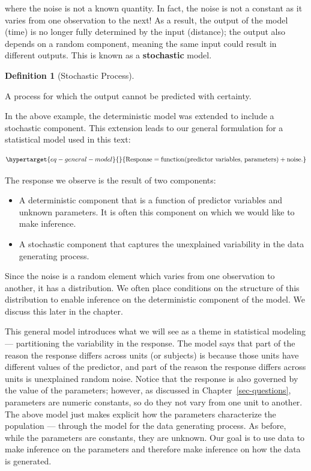 \documentclass[
  letterpaper,
  DIV=11,
  numbers=noendperiod]{scrreprt}
\providecommand{\tightlist}{%
  \setlength{\itemsep}{0pt}\setlength{\parskip}{0pt}}\usepackage{longtable,booktabs,array}
\theoremstyle{plain}
\theoremstyle{definition}
\theoremstyle{definition}
\newtheorem{definition}{Definition}[chapter]
\theoremstyle{remark}
\begin{document}
where the noise is not a known quantity. In fact, the noise is not a
constant as it varies from one observation to the next! As a result, the
output of the model (time) is no longer fully determined by the input
(distance); the output also depends on a random component, meaning the
same input could result in different outputs. This is known as a
\textbf{stochastic} model.

\begin{definition}[Stochastic
Process]\protect\hypertarget{def-stochastic-process}{}\label{def-stochastic-process}

A process for which the output cannot be predicted with certainty.

\end{definition}

In the above example, the deterministic model was extended to include a
stochastic component. This extension leads to our general formulation
for a statistical model used in this text:

\begin{equation}\protect\hypertarget{eq-general-model}{}{
\text{Response} = \text{function}(\text{predictor variables, parameters}) + \text{noise}.
}\label{eq-general-model}\end{equation}

The response we observe is the result of two components:

\begin{itemize}
\tightlist
\item
  A deterministic component that is a function of predictor variables
  and unknown parameters. It is often this component on which we would
  like to make inference.
\item
  A stochastic component that captures the unexplained variability in
  the data generating process.
\end{itemize}

Since the noise is a random element which varies from one observation to
another, it has a distribution. We often place conditions on the
structure of this distribution to enable inference on the deterministic
component of the model. We discuss this later in the chapter.

This general model introduces what we will see as a theme in statistical
modeling --- partitioning the variability in the response. The model
says that part of the reason the response differs across units (or
subjects) is because those units have different values of the predictor,
and part of the reason the response differs across units is unexplained
random noise. Notice that the response is also governed by the value of
the parameters; however, as discussed in Chapter~\ref{sec-questions},
parameters are numeric constants, so do they not vary from one unit to
another. The above model just makes explicit how the parameters
characterize the population --- through the model for the data
generating process. As before, while the parameters are constants, they
are unknown. Our goal is to use data to make inference on the parameters
and therefore make inference on how the data is generated.
\end{document}
